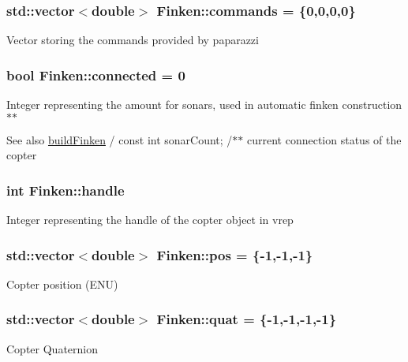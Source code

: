 \subsubsection[{\texorpdfstring{commands}{commands}}]{\setlength{\rightskip}{0pt plus 5cm}std\+::vector$<$double$>$ Finken\+::commands = \{0,0,0,0\}}\hypertarget{classFinken_aa4fe546d88b52ff92990bd67ced70567}{}\label{classFinken_aa4fe546d88b52ff92990bd67ced70567}
Vector storing the commands provided by paparazzi 
\subsubsection[{\texorpdfstring{connected}{connected}}]{\setlength{\rightskip}{0pt plus 5cm}bool Finken\+::connected = 0}\hypertarget{classFinken_a83131e08852cbcebaffa1eef80164a6e}{}\label{classFinken_a83131e08852cbcebaffa1eef80164a6e}
Integer representing the amount for sonars, used in automatic finken construction$\ast$$\ast$ \begin{DoxySeeAlso}{See also}
\hyperlink{finken_8h_ab8920c514423348469521fe0063534c4}{build\+Finken} / const int sonar\+Count; /$\ast$$\ast$ current connection status of the copter 
\end{DoxySeeAlso}
\subsubsection[{\texorpdfstring{handle}{handle}}]{\setlength{\rightskip}{0pt plus 5cm}int Finken\+::handle}\hypertarget{classFinken_a96990553bc26c8bf26effe8edd6e6369}{}\label{classFinken_a96990553bc26c8bf26effe8edd6e6369}
Integer representing the handle of the copter object in vrep 
\subsubsection[{\texorpdfstring{pos}{pos}}]{\setlength{\rightskip}{0pt plus 5cm}std\+::vector$<$double$>$ Finken\+::pos = \{-\/1,-\/1,-\/1\}}\hypertarget{classFinken_a726c0ea1d756fe0837a3f042665d8d4a}{}\label{classFinken_a726c0ea1d756fe0837a3f042665d8d4a}
Copter position (E\+NU) 
\subsubsection[{\texorpdfstring{quat}{quat}}]{\setlength{\rightskip}{0pt plus 5cm}std\+::vector$<$double$>$ Finken\+::quat = \{-\/1,-\/1,-\/1,-\/1\}}\hypertarget{classFinken_a3968cbe3b6f76678367ecb61f044a221}{}\label{classFinken_a3968cbe3b6f76678367ecb61f044a221}
Copter Quaternion 
